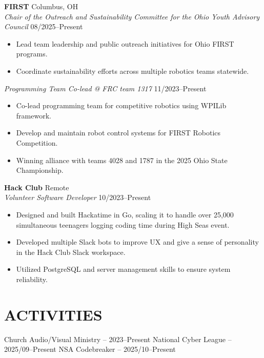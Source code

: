 \documentclass[a4paper,10pt]{article}
\newlength{\mpwidth}
\begin{document}
\textbf{FIRST} \hfill Columbus, OH\\
\textit{Chair of the Outreach and Sustainability Committee for the Ohio Youth Advisory Council} \hfill 08/2025--Present
\begin{minipage}{\mpwidth}
\begin{itemize}[nosep,after=\strut, leftmargin=1em, itemsep=3pt,label=--]
\item Lead team leadership and public outreach initiatives for Ohio FIRST programs.
\item Coordinate sustainability efforts across multiple robotics teams statewide.
\end{itemize}
\end{minipage}

\textit{Programming Team Co-lead @ FRC team 1317} \hfill 11/2023--Present
\begin{minipage}{\mpwidth}
\begin{itemize}[nosep,after=\strut, leftmargin=1em, itemsep=3pt,label=--]
\item Co-lead programming team for competitive robotics using WPILib framework.
\item Develop and maintain robot control systems for FIRST Robotics Competition.
\item Winning alliance with teams 4028 and 1787 in the 2025 Ohio State Championship.
\end{itemize}
\end{minipage}

\textbf{Hack Club} \hfill Remote\\
\textit{Volunteer Software Developer} \hfill 10/2023--Present
\begin{minipage}{\mpwidth}
\begin{itemize}[nosep,after=\strut, leftmargin=1em, itemsep=3pt,label=--]
\item Designed and built Hackatime in Go, scaling it to handle over 25,000 simultaneous teenagers logging coding time during High Seas event.
\item Developed multiple Slack bots to improve UX and give a sense of personality in the Hack Club Slack workspace.
\item Utilized PostgreSQL and server management skills to ensure system reliability.
\end{itemize}
\end{minipage}

\section{ACTIVITIES}
\begin{center}
{\small Church Audio/Visual Ministry -- 2023--Present \textbar{} National Cyber League -- 2025/09--Present \textbar{} NSA Codebreaker -- 2025/10--Present}
\end{center}

\vfill
{}
\end{document}

